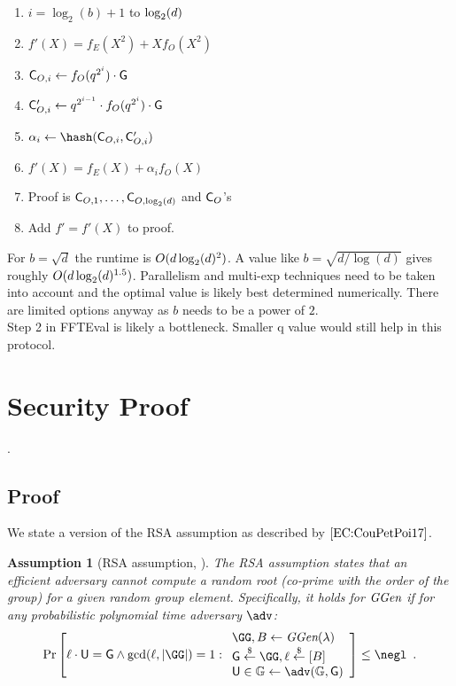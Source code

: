 \documentclass[12pt]{article}
\theoremstyle{Definition}
\newtheorem{assumption}{Assumption}
\begin{document}
\begin{mdframed}
\begin{enumerate}[nolistsep]
		\item \pcfor $i=\log_2(b)+1$ to $\log_2(d)$
		\item \pcind[1] $f'(X)=f_E(X^2)+Xf_O(X^2)$
		\item \pcind[1] $\mathsf{C}_{O,i}\gets f_O(q^{2^i}) \cdot \mathsf{G}$ 
		\item  \pcind[1] $\mathsf{C}_{O,i}'\gets q^{2^{i-1}} \cdot f_O(q^{2^i}) \cdot \mathsf{G}$ 
		\item \pcind[1] $\alpha_i\gets\hash(\gr{C}_{O,i},\gr{C}_{O,i}')$
		\item \pcind[1] $f'(X)=f_E(X)+\alpha_i f_O(X)$
		\item Proof is $\mathsf{C}_{O,1},\dots,\mathsf{C}_{O,\log_2(d)}$ and $\mathsf{C}_O$'s
		\item Add $f'=f'(X)$ to proof.
	\end{enumerate}
	\end{mdframed}
	For $b=\sqrt{d}$ the runtime is $O(d \log_2(d)^2)$. A value like $b=\sqrt{d/\log(d)}$ gives roughly $O(d\log_2(d)^{1.5})$. Parallelism and multi-exp techniques need to be taken into account and the optimal value is likely best determined numerically. There are limited options anyway as $b$ needs to be a power of $2$.\\ 
Step 2 in FFTEval is likely a bottleneck. Smaller q value would still help in this protocol.
\section{Security Proof}

.

\subsection{Proof}
We state a version of the RSA assumption as described by $\cite{EC:CouPetPoi17}$.
\begin{assumption}[RSA assumption,\cite{RivShaAdl78,EC:CouPetPoi17} ]
	The RSA assumption states that an efficient adversary cannot compute a random root (co-prime with the order of the group) for a given random group element. Specifically, it holds for $\textit{GGen}$ if for any probabilistic polynomial time adversary $\adv$:
	\[
    \Pr\left[\ell \cdot \gr{U} = \Generator \wedge \gcd(\ell,|\GG|)=1:
    \begin{array}{l}
         \GG,B \leftarrow \ggen(\lambda)  \\
         \Generator \sample \GG, \ell \sample [B]  \\
         \gr{U} \in \mathbb{G} \leftarrow \adv(\mathbb{G}, \Generator) \\
    \end{array}\right] \leq \negl \enspace .
\]

\end{assumption}
\end{document}
